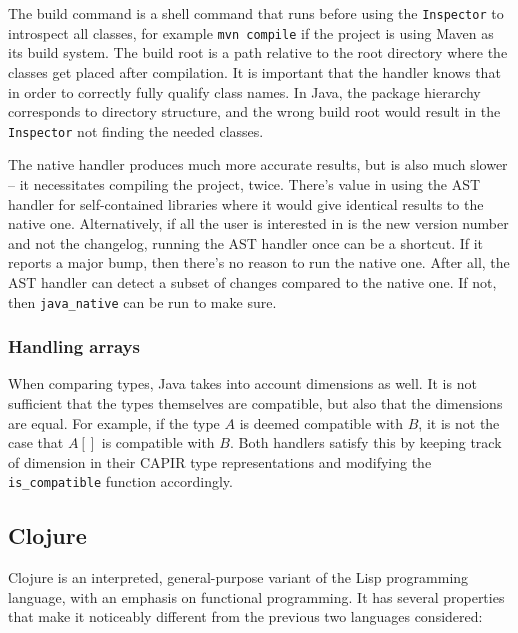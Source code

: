 \documentclass{l4proj}
\newcommand\genericstyle{\lstset{basicstyle=\ttm}}
\newcommand\codeinline[1]{{\genericstyle\lstinline!#1!}}
\begin{document}
The build command is a shell command that runs before using the
\codeinline{Inspector} to introspect all classes, for example
\codeinline{mvn compile} if the project is using Maven as its build
system. The build root is a path relative to the root directory where
the classes get placed after compilation. It is important that the
handler knows that in order to correctly fully qualify class names. In
Java, the package hierarchy corresponds to directory structure, and
the wrong build root would result in the \codeinline{Inspector} not
finding the needed classes.

The native handler produces much more accurate results, but is also
much slower -- it necessitates compiling the project, twice. There's
value in using the AST handler for self-contained libraries where it
would give identical results to the native one. Alternatively, if all
the user is interested in is the new version number and not the changelog,
running the AST handler once can be a shortcut. If it reports a major
bump, then there's no reason to run the native one. After all, the AST
handler can detect a subset of changes compared to the native one. If
not, then \codeinline{java_native} can be run to make sure.

\subsubsection{Handling arrays}

When comparing types, Java takes into account dimensions as well. It
is not sufficient that the types themselves are compatible, but also
that the dimensions are equal. For example, if the type $A$ is deemed
compatible with $B$, it is not the case that $A[]$ is compatible with
$B$. Both handlers satisfy this by keeping track of dimension in their
CAPIR type representations and modifying the
\codeinline{is_compatible} function accordingly.

\subsection{Clojure}
\label{Clojure}

Clojure is an interpreted, general-purpose variant of the Lisp
programming language, with an emphasis on functional programming. It
has several properties that make it noticeably different from the
previous two languages considered:
\end{document}
